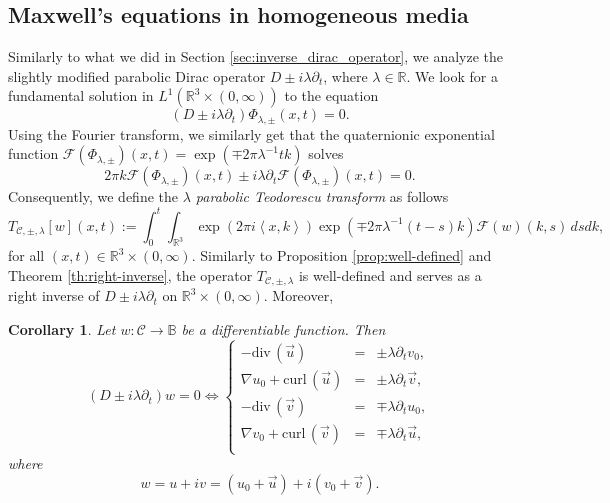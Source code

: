 \documentclass[12pt]{article}
\newtheorem{corollary}[theorem]{Corollary}
\def\R{\mathbb{R}}
\def\iff{\Leftrightarrow}
\def\div{\mbox{div}\,}
\def\curl{\mbox{curl}\,}
\def\B{\mathbb{B}}
\def\R{\mathbb{R}}
\def\iff{\Leftrightarrow}
\newcommand{\inner}[1]{\left\langle #1 \right\rangle}
\newcommand{\fourier}[1]{\mathcal{F}\left( #1 \right)}
\newcommand{\expo}[1]{\exp\left( #1\right)}
\begin{document}
\subsection{Maxwell's equations in homogeneous media}\label{subsec:maxwell_homogeneous}
Similarly to what we did in Section \ref{sec:inverse_dirac_operator}, we analyze the slightly modified parabolic Dirac operator $D\pm i\lambda\partial_t$, where $\lambda\in \mathbb{R}$. We look for a fundamental solution in $L^1(\R^3\times(0,\infty))$ to the equation
\[(D\pm i\lambda\partial_t)\Phi_{\lambda,\pm}(x,t)=0.\]
Using the Fourier transform, we similarly get that the quaternionic exponential function $\fourier{\Phi_{\lambda,\pm}}(x,t)=\expo{\mp 2\pi \lambda^{-1} tk}$ solves
\[2\pi k\fourier{\Phi_{\lambda,\pm}}(x,t)\pm i\lambda\partial_t\fourier{\Phi_{\lambda,\pm}}(x,t)=0.\]
Consequently, we define the \textit{$\lambda$ parabolic Teodorescu transform} as follows
\begin{equation}\label{eq:lambda-parabolic}
    T_{\mathscr{C},\pm,\lambda}[w](x,t):=\int_0^t\int_{\R^3} \expo{2\pi i\inner{x,k}}\expo{\mp 2\pi \lambda^{-1}(t-s)k}\fourier{w}(k,s)\, dsdk,
\end{equation}
for all $(x,t)\in \mathbb{R}^3\times(0,\infty)$. Similarly to Proposition \ref{prop:well-defined} and Theorem \ref{th:right-inverse}, the operator $T_{\mathscr{C},\pm,\lambda}$ is well-defined and serves as a right inverse of $D \pm i\lambda\partial_t$ on $\R^3\times (0,\infty)$. Moreover,

\begin{corollary}
    Let $w:\mathscr{C}\to\B$ be a differentiable function. Then 
    $$(D\pm i\lambda \partial_t)w=0\iff\left\{\begin{array}{rcl}
        -\div(\vec{u})&=&\pm \lambda\partial_t v_0,\\
        \nabla u_0+\curl(\vec{u})&=&\pm \lambda\partial_t\vec{v},\\
        -\div(\vec{v})&=&\mp \lambda\partial_t u_0,\\
        \nabla v_0+\curl(\vec{v})&=&\mp \lambda\partial_t\vec{u},\\
    \end{array}\right.$$
    where
    $$w=u+iv=(u_0+\vec{u})+i(v_0+\vec{v}).$$
\end{corollary}
\end{document}
